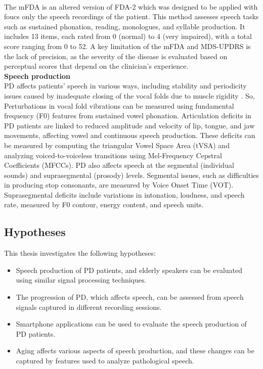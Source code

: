 \\The mFDA \cite{orozco2018neurospeech} is an altered version of FDA-2 which was designed to be applied with foucs only the speech recordings of the patient.
This method assesses speech tasks such as sustained phonation, reading, monologues, and syllable production. It includes 13 items, each rated from 0 (normal) to 4 (very impaired), with a total score ranging from 0 to 52. A key limitation of the mFDA and MDS-UPDRS is the lack of precision, as the severity of the disease is evaluated based on perceptual scores that depend on the clinician’s experience.\\


\textbf{Speech production}\\
PD affects patients’ speech in various ways, including stability and periodicity issues caused by inadequate closing of the vocal folds due to muscle rigidity \cite{hanson1984cinegraphic}.
So, Perturbations in vocal fold vibrations can be measured using fundamental frequency (F0) features from sustained vowel phonation.
Articulation deficits in PD patients are linked to reduced amplitude and velocity of lip, tongue, and jaw movements, affecting vowel and continuous speech production.
These deficits can be measured by computing the triangular Vowel Space Area (tVSA) and analyzing voiced-to-voiceless transitions using Mel-Frequency Cepstral Coefficients (MFCCs). PD also affects speech at the segmental (individual sounds) and suprasegmental (prosody) levels. Segmental issues, such as difficulties in producing stop consonants, are measured by Voice Onset Time (VOT). Suprasegmental deficits include variations in intonation, loudness, and speech rate, measured by F0 contour, energy content, and speech units.
\subsection{Hypotheses}
This thesis investigates the following hypotheses:
\begin{itemize}
    \item Speech production of PD patients, and elderly speakers can be evaluated using similar signal processing techniques.
    \item The progression of PD, which affects speech, can be assessed from speech signals captured in different recording sessions.
    \item Smartphone applications can be used to evaluate the speech production of PD patients.
    \item Aging affects various aspects of speech production, and these changes can be captured by features used to analyze pathological speech.
\end{itemize}